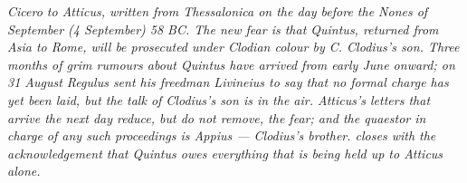 
\textit{Cicero to Atticus, written from Thessalonica on the
day before the Nones of September (4 September) 58 BC. The
new fear is that Quintus, returned from Asia to Rome, will be
prosecuted under Clodian colour by C. Clodius's son. Three
months of grim rumours about Quintus have arrived from early
June onward; on 31 August Regulus sent his freedman Livineius
to say that no formal charge has yet been laid, but the talk
of Clodius's son is in the air. Atticus's letters that arrive
the next day reduce, but do not remove, the fear; and the
\textit{quaestor} in charge of any such proceedings is
Appius --- Clodius's brother.  closes with the
acknowledgement that Quintus owes everything that is being
held up to Atticus alone.}
